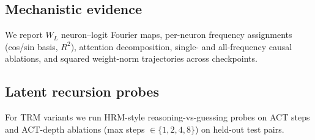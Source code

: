 \subsection{Mechanistic evidence}
We report $W_L$ neuron--logit Fourier maps, per-neuron frequency assignments (cos/sin basis, $R^2$), attention decomposition, single- and all-frequency causal ablations, and squared weight-norm trajectories across checkpoints.

\subsection{Latent recursion probes}
For TRM variants we run HRM-style reasoning-vs-guessing probes on ACT steps and ACT-depth ablations (max steps $\in\{1,2,4,8\}$) on held-out test pairs.
